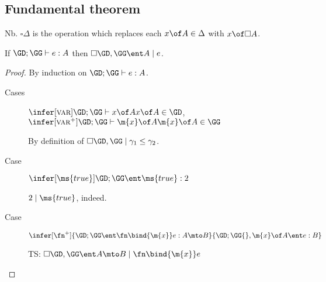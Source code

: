 \documentclass{article}
\newcommand{\lr}[2]{#1\mathrel{|}#2}
\newcommand{\disc}[1]{\square{#1}}
\begin{document}


\subsection{Fundamental theorem}

\newcommand{\cxdisc}[1]{\disc{#1}}

Nb. $\cxdisc{\Delta}$ is the operation which replaces each $x \of A \in \Delta$
with $x \of \disc{A}$.

\begin{theorem}
  If $\GD;\GG \vdash e : A$ then $\lr{\cxdisc{\GD},\GG \ent A}{e}$.
\end{theorem}

\begin{proof}
  By induction on $\GD;\GG \vdash e : A$.
  \begin{description}
  \item[Cases] $\infer[\rt{var}]{\GD;\GG \vdash x \of A}{x \of A \in \GD}$,
    $\infer[\rt{var}^+]{\GD;\GG \vdash \m{x} \of A}{\m{x} \of A \in \GG}$

    By definition of $\lr{\cxdisc{\GD},\GG}{\gamma_1 \le \gamma_2}$.

  \item[Case] $\infer[\ms{true}]{\GD;\GG\ent \ms{true} : 2}{}$

    $\lr{2}{\ms{true}}$, indeed.



  \item[Case] $\infer[\fn^+]{\GD;\GG \ent \fn\bind{\m{x}} e : A \mto B}{
    \GD; \GG{},\m{x}\of A \ent e : B}$

    TS: $\lr{\cxdisc{\GD},\GG \ent A \mto B}{\fn\bind{\m{x}} e}$
  \end{description}
\end{proof}
\end{document}
